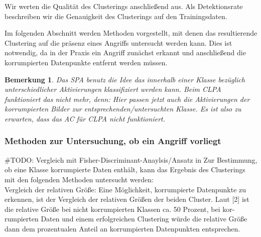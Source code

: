 \documentclass[twoside, 11pt,a4paper]{article}
\newtheorem{remark}[theorem]{Bemerkung}
\numberwithin{equation}{section}
\begin{document}
		Wir werten die Qualität des Clusterings anschließend aus. Als Detektionsrate
		beschreiben wir die Genauigkeit des Clusterings auf den Trainingsdaten.
		
		Im folgenden Abschnitt werden Methoden vorgestellt, mit denen das resultierende Clustering auf die präsenz eines Angriffs untersucht werden kann. Dies ist notwendig, da in der Praxis ein Angriff zunächst erkannt und anschließend die korrumpierten Datenpunkte entfernt werden müssen. 
		
		\begin{remark}
			Das SPA benutz die Idee das innerhalb einer Klasse bezüglich unterschiedlicher Aktivierungen klassifiziert werden kann. Beim CLPA funktioniert das nicht mehr, denn: Hier passen jetzt auch die Aktivierungen der korrumpierten Bilder zur entsprechenden/untersuchten Klasse. Es ist also zu erwarten, dass das AC für CLPA nicht funktioniert.
		\end{remark}
		
		
		\subsubsection{Methoden zur Untersuchung, ob ein Angriff vorliegt}
		\#TODO: Vergleich mit Fisher-Discriminant-Anaylsis/Ansatz in \cite{imagenet_unhansed_v1}
		Zur
		Bestimmung, ob eine Klasse korrumpierte Daten enthält, kann das Ergebnis
		des Clusterings mit den folgenden Methoden untersucht werden:\\
		
		\noindent {}
		{Vergleich der relativen Größe:} Eine Möglichkeit, korrumpierte Datenpunkte
		zu erkennen, ist der Vergleich der relativen Größen der beiden Cluster. Laut [2]
		ist die relative Größe bei nicht korrumpierten Klassen ca. 50 Prozent, bei kor-
		rumpierten Daten und einem erfolgreichen Clustering würde die relative Größe
		dann dem prozentualen Anteil an korrumpierten Datenpunkten entsprechen.\\
		
\end{document}
